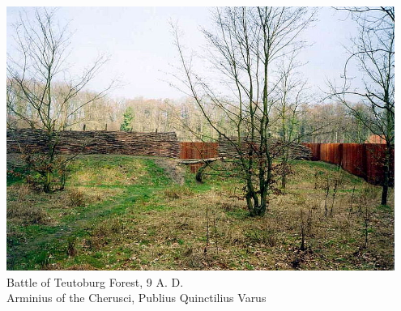 \begin{frame}
    \centering
    \includegraphics[width=0.95\textwidth]{img/Varus01.jpg} \\
    Battle of Teutoburg Forest, 9 A. D. \\
        Arminius of the Cherusci, Publius Quinctilius Varus \\
\end{frame}

